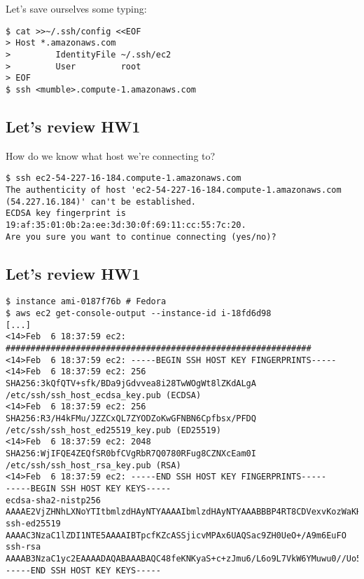 \documentclass[xga]{xdvislides}
\begin{document}
Let's save ourselves some typing:
\begin{verbatim}
$ cat >>~/.ssh/config <<EOF
> Host *.amazonaws.com
>         IdentityFile ~/.ssh/ec2
>         User         root
> EOF
$ ssh <mumble>.compute-1.amazonaws.com
\end{verbatim}

\subsection{Let's review HW1}
\vspace{.5in}

How do we know what host we're connecting to?
\begin{verbatim}
$ ssh ec2-54-227-16-184.compute-1.amazonaws.com
The authenticity of host 'ec2-54-227-16-184.compute-1.amazonaws.com
(54.227.16.184)' can't be established.
ECDSA key fingerprint is 19:af:35:01:0b:2a:ee:3d:30:0f:69:11:cc:55:7c:20.
Are you sure you want to continue connecting (yes/no)? 
\end{verbatim}

\subsection{Let's review HW1}
\begin{verbatim}
$ instance ami-0187f76b # Fedora
$ aws ec2 get-console-output --instance-id i-18fd6d98
[...]
<14>Feb  6 18:37:59 ec2: #############################################################
<14>Feb  6 18:37:59 ec2: -----BEGIN SSH HOST KEY FINGERPRINTS-----
<14>Feb  6 18:37:59 ec2: 256 SHA256:3kQfQTV+sfk/BDa9jGdvvea8i28TwWOgWt8lZKdALgA /etc/ssh/ssh_host_ecdsa_key.pub (ECDSA)
<14>Feb  6 18:37:59 ec2: 256 SHA256:R3/H4kFMu/JZZCxQL7ZYODZoKwGFNBN6Cpfbsx/PFDQ /etc/ssh/ssh_host_ed25519_key.pub (ED25519)
<14>Feb  6 18:37:59 ec2: 2048 SHA256:WjIFQE4ZEQfSR0bfCVgRbR7Q0780RFug8CZNXcEam0I /etc/ssh/ssh_host_rsa_key.pub (RSA)
<14>Feb  6 18:37:59 ec2: -----END SSH HOST KEY FINGERPRINTS-----
-----BEGIN SSH HOST KEY KEYS-----
ecdsa-sha2-nistp256 AAAAE2VjZHNhLXNoYTItbmlzdHAyNTYAAAAIbmlzdHAyNTYAAABBBP4RT8CDVexvKozWaKH4eOnGaDkm+EucrbmZzMTiYgSmXmkOkwL1Rwt18jrXRtKm1z+MqNu3plAxkiTeT62HxfY=
ssh-ed25519 AAAAC3NzaC1lZDI1NTE5AAAAIBTpcfKZcASSjicvMPAx6UAQSac9ZH0UeO+/A9m6EuFO
ssh-rsa AAAAB3NzaC1yc2EAAAADAQABAAABAQC48feKNKyaS+c+zJmu6/L6o9L7VkW6YMuwu0//Uo5uS46YhMO5GY/cyerlS/o404ZKVuRbBhpRTPWlccMFpDBtE5jdoejdEl5lWK0w9MNfQ7lmSTjnCbqRy+0GWi/ig7zI6lBYFoh85PNCJxh+FQFOpBtQVz+L6Wo4GPWFVpqO0NUkNt4IlTfXTQIoRJ3uY6qHcdhA0pihb55QIlImG8EXStbVOBQXVceKMWmQhXsHtDrEu+zHYfUNffCbryBwb9uIn0kkmL105VaegoPayv7hoUqM3+RuHHBzt4xdNFS4QYVNSYJRTLGQ+tFEmgWNIbRHlqB2TKlsH5JLRwcjFOkb
-----END SSH HOST KEY KEYS-----
\end{verbatim}
\end{document}
